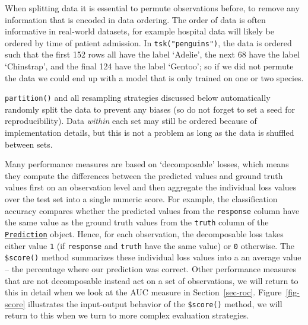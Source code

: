 \begin{tcolorbox}[enhanced jigsaw, opacitybacktitle=0.6, rightrule=.15mm, opacityback=0, arc=.35mm, breakable, titlerule=0mm, colframe=quarto-callout-tip-color-frame, coltitle=black, bottomrule=.15mm, toprule=.15mm, colback=white, colbacktitle=quarto-callout-tip-color!10!white, bottomtitle=1mm, toptitle=1mm, title=\textcolor{quarto-callout-tip-color}{\faLightbulb}\hspace{0.5em}{Permuting Observations for Performance Estimation}, leftrule=.75mm, left=2mm]

When splitting data it is essential to permute observations before, to
remove any information that is encoded in data ordering. The order of
data is often informative in real-world datasets, for example hospital
data will likely be ordered by time of patient admission. In
\texttt{tsk("penguins")}, the data is ordered such that the first 152
rows all have the label `Adelie', the next 68 have the label
`Chinstrap', and the final 124 have the label `Gentoo'; so if we did not
permute the data we could end up with a model that is only trained on
one or two species.

\texttt{partition()} and all resampling strategies discussed below
automatically randomly split the data to prevent any biases (so do not
forget to set a seed for reproducibility). Data \emph{within} each set
may still be ordered because of implementation details, but this is not
a problem as long as the data is shuffled between sets.

\end{tcolorbox}

Many performance measures are based on `decomposable' losses, which
means they compute the differences between the predicted values and
ground truth values first on an observation level and then aggregate the
individual loss values over the test set into a single numeric score.
For example, the classification accuracy compares whether the predicted
values from the \texttt{response} column have the same value as the
ground truth values from the \texttt{truth} column of the
\href{https://mlr3.mlr-org.com/reference/Prediction.html}{\texttt{Prediction}}
object. Hence, for each observation, the decomposable loss takes either
value \texttt{1} (if \texttt{response} and \texttt{truth} have the same
value) or \texttt{0} otherwise. The \texttt{\$score()} method summarizes
these individual loss values into a an average value -- the percentage
where our prediction was correct. Other performance measures that are
not decomposable instead act on a set of observations, we will return to
this in detail when we look at the AUC measure in Section~\ref{sec-roc}.
Figure~\ref{fig-score} illustrates the input-output behavior of the
\texttt{\$score()} method, we will return to this when we turn to more
complex evaluation strategies.

